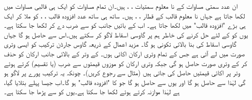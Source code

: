 ان  عدد سمتی مساوات کے نا معلوم سمتیات ، ،  ہیں۔ان تمام مساوات کو ایک ہی قالبی مساوات  میں لکھا جاتا ہے جہاں نا معلوم قالب  کے قطار ، ،  ہیں۔ ساتھ ہی ساتھ  عدد افزودہ قالب ، ،   کو ملا کر ایک ہی   بڑے "افزودہ قالب"  میں لکھا جاتا ہے۔ اب  کے بائیں جانب کو  سے ضرب دے کر  لکھا جا سکتا ہے۔  یوں  کو  کے لئے حل کرنے کی خاطر ہم  پر گاوسی اسقاط لاگو  کر سکتے ہیں۔اس سے  حاصل ہو گا جہاں گاوسی اسقاط کی بنا  بالائی تکونی ہو گا۔ مزید اعمال کے ذریعہ گاوس جارڈن ترکیب  کو ایسی وتری صورت میں لے آتی ہے جس کے تمام وتری ارکان اکائی  ہوں۔ کے وتر کے بالائی جانب ارکان کو حذف کر کے وتری صورت حاصل ہو گی جبکہ وتری ارکان کو موزوں قیمتوں سے ضرب (یا تقسیم) کرتے ہوئے وتر پر اکائی قیمتیں حاصل کی جاتی ہیں (مثال  سے رجوع کریں)۔ چونکہ یہ ترکیب پورے  پر لاگو ہو گی لہٰذا  سے  حاصل ہو گا اور یوں  سے  حاصل ہو گا جو  کا "افزودہ قالب" ہو گا۔اب جیسا پہلے بتلایا گیا،  ہے لہٰذا موازنہ کرتے ہوئے  لکھا جا سکتا ہے۔یوں  کو  سے پڑھا جا سکتا ہے۔

